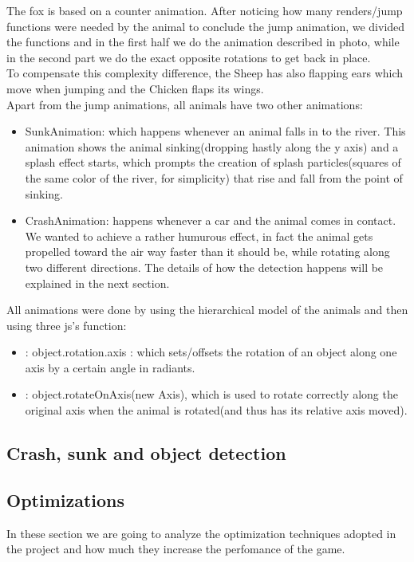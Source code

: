 \documentclass[a4paper, 11pt]{article}
\begin{document}
The fox is based on a counter animation. After noticing how many renders/jump functions were needed by the animal to conclude the jump animation, we divided the functions and in the first half we do the animation described in photo, while in the second part we do the exact opposite rotations to get back in place.\\
To compensate this complexity difference, the Sheep has also flapping ears which move when jumping and the Chicken flaps its wings.\\
Apart from the jump animations, all animals have two other animations:
\begin{itemize}
\item SunkAnimation: which happens whenever an animal falls in to the river. This animation shows the animal sinking(dropping hastly along the y axis) and a splash effect starts, which prompts the creation of splash particles(squares of the same color of the river, for simplicity) that rise and fall from the point of sinking.
\item CrashAnimation: happens whenever a car and the animal comes in contact. We wanted to achieve a rather humurous effect, in fact the animal gets propelled toward the air way faster than it should be, while rotating along two different directions. The details of how the detection happens will be explained in the next section.
\end{itemize}
All animations were done by using the hierarchical model of the animals and then using three js's function:
\begin{itemize}
\item : object.rotation.axis : which sets/offsets the rotation of an object along one axis  by a certain angle in radiants.
\item: object.rotateOnAxis(new Axis), which is used to rotate correctly along the original axis when the animal is rotated(and thus has its relative axis moved).
\end{itemize}
\subsection{Crash, sunk and object detection}
\subsection{Optimizations}
%
In these section we are going to analyze the optimization techniques adopted in the project and how much they increase the perfomance of the game. \\
\end{document}
